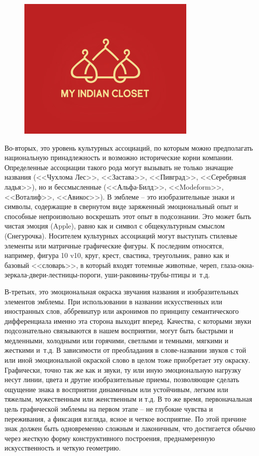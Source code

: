 \begin{figure}[h!]
  \centering
  \includegraphics[width=.5\linewidth]{images/indiancloset}
  \caption{}  %
  \label{fig:indiancloset}
\end{figure}

Во-вторых, это уровень культурных ассоциаций, по которым можно предполагать
национальную принадлежность и возможно  исторические корни компании. Определенные
ассоциации такого рода могут вызывать не только значащие
названия (<<Чухлома Лес>>, <<Застава>>, <<Пивград>>, <<Серебряная ладья>>), но
и бессмысленные (<<Альфа-Билд>>, <<Modeform>>, <<Воталиф>>, <<Авикос>>).
В эмблеме -- это изобразительные знаки и символы, содержащие в свернутом виде
заряженный эмоциональный опыт и способные непроизвольно воскрешать этот опыт
в подсознании. Это может быть чистая эмоция (Apple), равно как и символ с
общекультурным смыслом (Снегурочка). Носителем культурных ассоциаций могут
выступать стилевые элементы или матричные графические фигуры. К последним
относятся, например, фигура 10 v10, круг, крест, свастика, треугольник,
равно как и базовый <<словарь>>, в который входят тотемные животные, череп,
глаза-окна-зеркала-двери-лестницы-пороги, уши-раковины-трубы-птицы
и~т.д.

В-третьих, это эмоциональная окраска звучания названия и изобразительных
элементов эмблемы. При использовании в названии искусственных или иностранных
слов, аббревиатур или акронимов по принципу семантического дифференциала именно
эта сторона выходит вперед. Качества, с которыми звуки подсознательно связываются
в нашем восприятии, могут быть быстрыми и медленными, холодными или горячими,
светлыми и темными, мягкими и жесткими
и~т.д.\autocite{juravlev1991zvuk} В зависимости от преобладания в слове-названии
звуков с той или иной эмоциональной окраской слово в целом тоже приобретает эту
окраску. Графически, точно так же как и звуки, ту или иную эмоциональную
нагрузку несут линии, цвета и другие изобразительные приемы, позволяющие
сделать ощущение знака в восприятии динамичным или устойчивым, легким или
тяжелым, мужественным или женственным и т.д. В то же время, первоначальная цель
графической эмблемы на первом этапе -- не глубокие чувства и переживания, а
фиксация взгляда, ясное и четкое восприятие. По этой причине знак должен быть
одновременно сложным и лаконичным, что достигается обычно через жесткую форму
конструктивного построения, преднамеренную искусственность и четкую геометрию.

